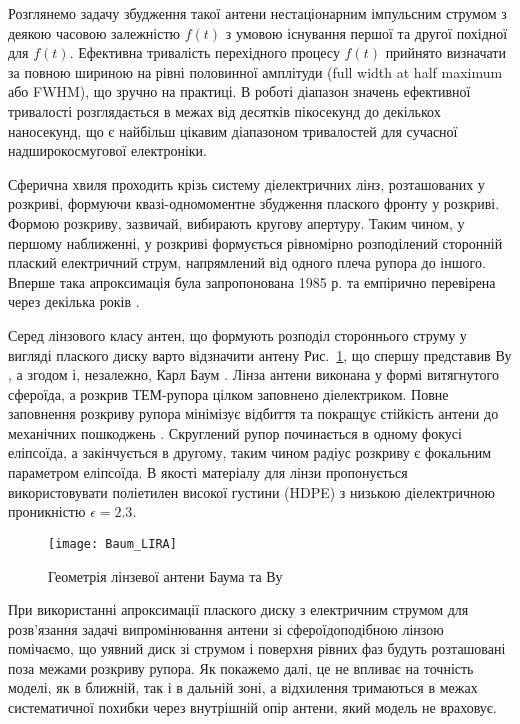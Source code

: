 Розглянемо задачу збудження такої антени нестаціонарним імпульсним струмом
з деякою часовою залежністю $ f(t) $ з умовою існування першої та другої 
похідної для $ f(t) $. Ефективна тривалість перехідного процесу $ f(t) $ 
прийнято визначати за повною шириною на рівні половинної амплітуди 
(full width at half maximum або FWHM), що зручно на практиці. 
В роботі діапазон значень ефективної тривалості розглядається в межах 
від десятків пікосекунд до декількох наносекунд, що є найбільш цікавим 
діапазоном тривалостей для сучасної надширокосмугової електроніки.

Сферична хвиля проходить крізь систему діелектричних лінз, розташованих у 
розкриві, формуючи квазі-одномоментне збудження плаского фронту у розкриві. 
Формою розкриву, зазвичай, вибирають кругову апертуру. Таким чином, у першому 
наближенні, у розкриві формується рівномірно розподілений сторонній плаский 
електричний струм, напрямлений від одного плеча рупора до іншого. Вперше така
апроксимація була запропонована 1985 р. \cite{imp:Wu1985} та 
емпірично перевірена через декілька років \cite{imp:Wu1991}.

Серед лінзового класу антен, що формують розподіл стороннього струму у 
вигляді плаского диску варто відзначити антену Рис.~\ref{fig:lira_baum}, що 
спершу представив Ву \cite{imp:Wu1987}, а згодом і, незалежно, Карл Баум 
\cite{imp:BaumSSN0377}. Лінза антени виконана у формі витягнутого сфероїда, 
а розкрив ТЕМ-рупора цілком заповнено діелектриком. Повне заповнення 
розкриву рупора мінімізує відбиття та покращує стійкість антени до механічних 
пошкоджень \cite{imp:BaumSSN0377}. Скруглений рупор починається в одному 
фокусі еліпсоїда, а закінчується в другому, таким чином радіус розкриву є 
фокальним параметром еліпсоїда. В якості матеріалу для лінзи пропонується 
використовувати поліетилен високої густини (HDPE) з низькою діелектричною 
проникністю $\epsilon = 2.3 $.

\begin{figure}[htbp] \begin{center}
\texttt{[image: Baum\_LIRA]}
\caption{Геометрія лінзевої антени Баума та Ву} \label{fig:lira_baum}
\end{center} \end{figure}

При використанні апроксимації плаского диску з електричним струмом для 
розв'язання задачі випромінювання антени зі сфероїдоподібною лінзою 
помічаємо, що уявний диск зі струмом і поверхня рівних фаз будуть розташовані 
поза межами розкриву рупора. Як покажемо далі, це не впливає на точність 
моделі, як в ближній, так і в дальній зоні, а відхилення тримаються в межах
систематичної похибки через внутрішній опір антени, який модель не враховує.

